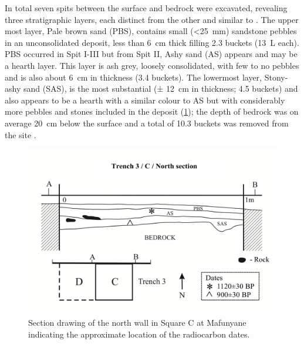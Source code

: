 In total seven spits between the surface and bedrock were excavated, revealing three stratigraphic layers, each distinct from the other and similar to \textcite{Walker_1994}. 
The upper most layer, Pale brown sand (PBS), contains small (<\SI{25}{\milli\meter}) sandstone pebbles in an unconsolidated deposit,
 less than \SI{6}{\centi\meter} thick filling \num{2,3} buckets (\SI{13}{\liter} each). 
PBS occurred in Spit I-III but from Spit II, Ashy sand (AS) appears and may be a hearth layer. 
This layer is ash grey, loosely consolidated, with few to no pebbles and is also about \SI{6}{\centi\meter} in thickness (\num{3.4} buckets). 
The lowermost layer, Stony-ashy sand (SAS), is the most substantial (± \SI{12}{\centi\meter} in thickness; \num{4.5} buckets) and also appears to be a hearth with a similar colour to AS but with considerably more pebbles and stones included in the deposit (\cref{fig:Forssman-Figure03}); 
the depth of bedrock was on average \SI{20}{\centi\meter} below the surface and a total of \num{10.3} buckets was removed from the site \parencite[for more details see][95]{Forssman_2014a}. 

	\begin{figure}
		\includegraphics[width=\linewidth]{figures/Forssman-Figure03}
		\caption{Section drawing of the north wall in Square C at Mafunyane indicating the approximate location of the radiocarbon dates.}
		\centering
		\label{fig:Forssman-Figure03}
	\end{figure}

